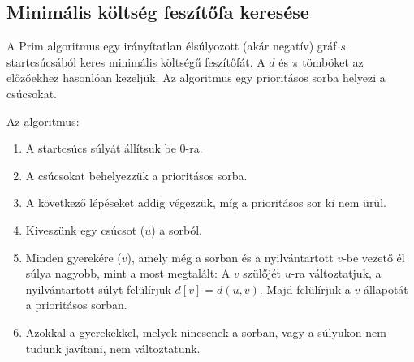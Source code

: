 \documentclass[margin=0px]{article}
\begin{document}
		\subsection{Minimális költség feszítőfa keresése}
			A Prim algoritmus egy irányítatlan élsúlyozott (akár negatív) gráf $s$ startcsúcsából keres minimális költségű feszítőfát. A $d$ és $\pi$ tömböket az előzőekhez hasonlóan kezeljük. Az algoritmus egy prioritásos sorba helyezi a csúcsokat.
			
			Az algoritmus:
			\begin{enumerate}
				\item A startcsúcs súlyát állítsuk be 0-ra.
				\item A csúcsokat behelyezzük a prioritásos sorba. 
				\item A következő lépéseket addig végezzük, míg a prioritásos sor ki nem ürül.
				\item Kiveszünk egy csúcsot ($u$) a sorból.
				\item Minden gyerekére ($v$), amely még a sorban és a nyilvántartott $v$-be vezető él súlya nagyobb, mint a most megtalált: A $v$ szülőjét $u$-ra változtatjuk, a nyilvántartott súlyt felülírjuk $d[v] = d(u,v)$. Majd felülírjuk a $v$ állapotát a prioritásos sorban.
				\item Azokkal a gyerekekkel, melyek nincsenek a sorban, vagy a súlyukon nem tudunk javítani, nem változtatunk.
			\end{enumerate}
\end{document}
